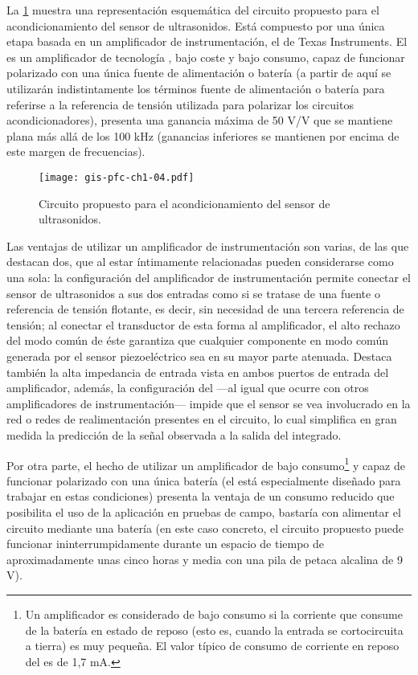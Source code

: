 La \cref{fig:sensor-conditioner} muestra una representación esquemática del
circuito propuesto para el acondicionamiento del sensor de ultrasonidos.
Está compuesto por una única etapa basada en un amplificador de
instrumentación, el  de Texas Instruments. El  es
un amplificador de tecnología , bajo coste y bajo consumo, capaz
de funcionar polarizado con una única fuente de alimentación o batería (a
partir de aquí se utilizarán indistintamente los términos fuente de
alimentación o batería para referirse a la referencia de tensión utilizada
para polarizar los circuitos acondicionadores), presenta una ganancia
máxima de 50 V/V que se mantiene plana más allá de los 100 kHz (ganancias
inferiores se mantienen por encima de este margen de frecuencias).

\begin{figure}
    \begin{center}
	\texttt{[image: gis-pfc-ch1-04.pdf]}
    \end{center}
    \caption[Circuito de acondicionamiento del sensor
    piezoeléctrico]{Circuito propuesto para el acondicionamiento del sensor
    de ultrasonidos.}
    \label{fig:sensor-conditioner}
\end{figure}

Las ventajas de utilizar un amplificador de instrumentación son varias, de
las que destacan dos, que al estar íntimamente relacionadas pueden
considerarse como una sola: la configuración del amplificador de
instrumentación permite conectar el sensor de ultrasonidos a sus dos
entradas como si se tratase de una fuente o referencia de tensión flotante,
es decir, sin necesidad de una tercera referencia de tensión; al conectar
el transductor de esta forma al amplificador, el alto rechazo del modo
común de éste garantiza que cualquier componente en modo común generada por
el sensor piezoeléctrico sea en su mayor parte atenuada. Destaca también la
alta impedancia de entrada vista en ambos puertos de entrada del
amplificador, además, la configuración del  ---al igual que
ocurre con otros amplificadores de instrumentación--- impide que el sensor
se vea involucrado en la red o redes de realimentación presentes en el
circuito, lo cual simplifica en gran medida la predicción de la señal
observada a la salida del integrado.

Por otra parte, el hecho de utilizar un amplificador de bajo
consumo\footnote{Un amplificador es considerado de bajo consumo si la
corriente que consume de la batería en estado de reposo (esto es, cuando la
entrada se cortocircuita a tierra) es muy pequeña. El valor típico de
consumo de corriente en reposo del  es de 1,7 mA.} y capaz de
funcionar polarizado con una única batería (el  está
especialmente diseñado para trabajar en estas condiciones) presenta la
ventaja de un consumo reducido que posibilita el uso de la aplicación en
pruebas de campo, bastaría con alimentar el circuito mediante una batería
(en este caso concreto, el circuito propuesto puede funcionar
ininterrumpidamente durante un espacio de tiempo de aproximadamente unas
cinco horas y media con una pila de petaca alcalina de 9 V).

